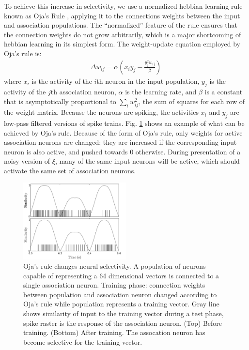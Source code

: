 \documentclass[10pt,letterpaper]{article}
\begin{document}
To achieve this increase in selectivity, we use a normalized hebbian learning rule known as Oja's Rule \citep{oja}, applying it to the connections weights between the input and association populations. The ``normalized'' feature of the rule ensures that the connection weights do not grow arbitrarily, which is a major shortcoming of hebbian learning in its simplest form. The weight-update equation employed by Oja's rule is:
\begin{align}
  \Delta w_{ij} = \alpha (x_i y_j - \frac{y_j^2 w_{ij}}{\beta})
\end{align}
where $x_i$ is the activity of the $i$th neuron in the input population, $y_j$ is the activity of the $j$th association neuron, $\alpha$ is the learning rate, and $\beta$ is a constant that is asymptotically proportional to $\sum_i w_{ij}^2$, the sum of squares for each row of the weight matrix. Because the neurons are spiking, the activities $x_i$ and $y_j$ are low-pass filtered versions of spike trains. Fig. \ref{fig:oja} shows an example of what can be achieved by Oja's rule. Because of the form of Oja's rule, only weights for active association neurons are changed; they are increased if the corresponding input neuron is also active, and pushed towards 0 otherwise. During presentation of a noisy version of $\xi$, many of the same input neurons will be active, which should activate the same set of association neurons.
\begin{figure}[h]
\begin{center}
\includegraphics[width=0.5\textwidth]{../default_plots/oja_plot_D_64.pdf}
\end{center}
\caption{Oja's rule changes neural selectivity. A population of neurons capable of representing a 64 dimensional vectors is connected to a single association neuron. Training phase: connection weights between population and association neuron changed according to Oja's rule while population represents a training vector. Gray line shows similarity of input to the training vector during a test phase, spike raster is the response of the association neuron. (Top) Before training. (Bottom) After training. The assocation neuron has become selective for the training vector.}
\label{fig:oja}
\end{figure}
\end{document}
